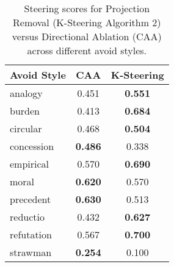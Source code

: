 \begin{table}[H]
\centering
\begin{tabular}{lcc}
\toprule
\textbf{Avoid Style} & \textbf{CAA} & \textbf{K-Steering} \\
\midrule
analogy & 0.451 & \textbf{0.551} \\
burden & 0.413 & \textbf{0.684} \\
circular & 0.468 & \textbf{0.504} \\
concession & \textbf{0.486} & 0.338 \\
empirical & 0.570 & \textbf{0.690} \\
moral & \textbf{0.620} & 0.570 \\
precedent & \textbf{0.630} & 0.513 \\
reductio & 0.432 & \textbf{0.627} \\
refutation & 0.567 & \textbf{0.700} \\
strawman & \textbf{0.254} & 0.100 \\
\bottomrule
\end{tabular}
\caption{Steering scores for Projection Removal (K-Steering Algorithm 2) versus Directional Ablation (CAA) across different avoid styles.}
\end{table}